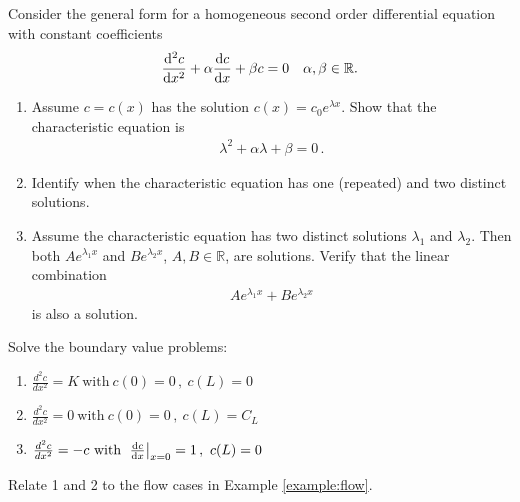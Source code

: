 \begin{exerciseregion}

	\begin{exercise}
		Consider the general form for a homogeneous second order differential equation with constant
		coefficients
		\begin{eqnarray}
			\frac{\mathrm{d}^2c}{\mathrm{d} x^2} + \alpha \frac{\mathrm{d} c}{\mathrm{d} x} + \beta c = 0 \ \ \ \alpha, \beta \in \mathbb{R}.
		\end{eqnarray}
		\begin{enumerate}	
			\item Assume $c=c(x)$ has the solution $c(x)=c_0 e^{\lambda x}$. Show that the
				characteristic equation is
				\begin{eqnarray}
					\lambda^2 + \alpha \lambda  + \beta = 0 \, .
				\end{eqnarray}
			\item Identify when the characteristic equation has one (repeated) 
				and two distinct solutions.
			\item Assume the characteristic equation has two distinct 
				solutions $\lambda_1$ and $\lambda_2$. Then both
				$Ae^{\lambda_1x}$ and $Be^{\lambda_2x}$, $A,B \in \mathbb{R}$, 
				are solutions. Verify that the linear combination 
				\begin{eqnarray}
					Ae^{\lambda_1x} + Be^{\lambda_2x} 
				\end{eqnarray}
				is also a solution.
		\end{enumerate}
	\end{exercise}

	\begin{exercise}
	  Solve the boundary value problems:
	  \begin{enumerate}
	  \item  
		$\frac{d^2c}{dx^2} = K \ \text{with} \  c(0) =0\, , \ c(L)=0$

	   \item 
		$\frac{d^2c}{dx^2} = 0 \ \text{with} \ c(0)=0\, , \ c(L)=C_L $
	  \item 
		$\frac{d^2c}{dx^2} = -c \ \text{with} \  \left.\frac{\mathrm{d} c}{\mathrm{d} x}\right|_{x=0} =1\, , \ c(L)=0$
	  \end{enumerate}
	  Relate 1 and 2 to the flow cases in Example \ref{example:flow}.
	\end{exercise}


\end{exerciseregion}

